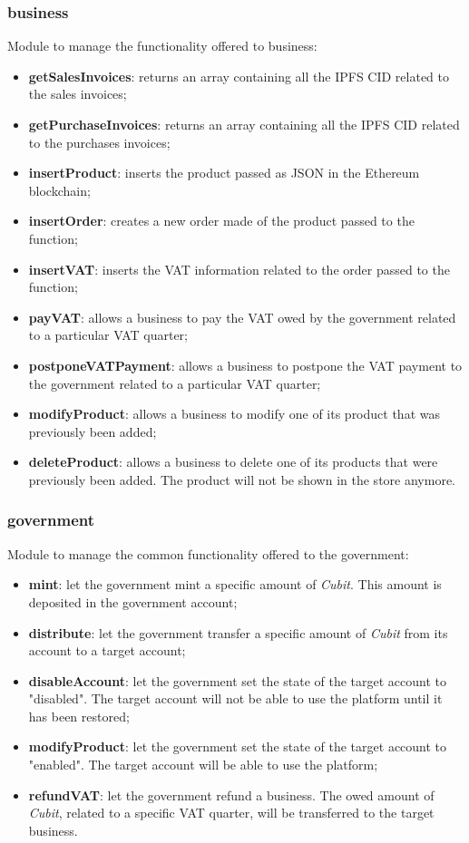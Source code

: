 \subsubsection{business}
Module to manage the functionality offered to business:
\begin{itemize}
	\item \textbf{getSalesInvoices}: returns an array containing all the IPFS CID related to the sales invoices;
	\item \textbf{getPurchaseInvoices}: returns an array containing all the IPFS CID related to the purchases invoices;
	
	\item \textbf{insertProduct}: inserts the product passed as JSON in the Ethereum blockchain; 
	\item \textbf{insertOrder}: creates a new order made of the product passed to the function;
	\item \textbf{insertVAT}: inserts the VAT information related to the order passed to the function;
	\item \textbf{payVAT}: allows a business to pay the VAT owed by the government related to a particular VAT quarter;
	\item \textbf{postponeVATPayment}: allows a business to postpone the VAT payment to the government related to a particular VAT quarter;
	\item \textbf{modifyProduct}: allows a business to modify one of its product that was previously been added;
	\item \textbf{deleteProduct}: allows a business to delete one of its products that were previously been added. The product will not be shown in the store anymore.
\end{itemize}
\subsubsection{government}
Module to manage the common functionality offered to the government:
\begin{itemize}
	\item \textbf{mint}: let the government mint a specific amount of \textit{Cubit}. This amount is deposited in the government account;
	\item \textbf{distribute}: let the government transfer a specific amount of \textit{Cubit} from its account to a target account;
	\item \textbf{disableAccount}: let the government set the state of the target account to "disabled". The target account will not be able to use the platform until it has been restored;
	\item \textbf{modifyProduct}: let the government set the state of the target account to "enabled". The target account will be able to use the platform;
	\item \textbf{refundVAT}: let the government refund a business. The owed amount of \textit{Cubit}, related to a specific VAT quarter, will be transferred to the target business.
\end{itemize}
